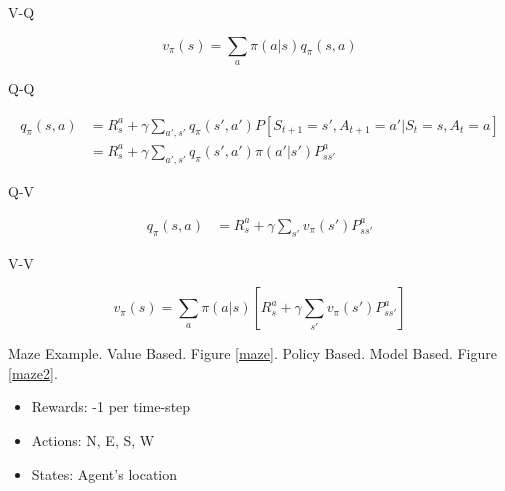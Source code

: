 \documentclass[english]{article}
\begin{document}
V-Q

$$v_\pi(s) = \sum_{a} \pi(a|s) q_\pi(s,a)$$

Q-Q

\begin{align*}
q_\pi(s,a) &= R_s^a +\gamma 
\sum_{a',s'} q_\pi(s',a')
P[S_{t+1}=s',A_{t+1} = a'|S_t = s, A_t=a]\\
&= R_s^a +\gamma 
\sum_{a',s'} q_\pi(s',a')
\pi(a'|s')P_{ss'}^a
\end{align*}

Q-V

\begin{align*}
q_\pi(s,a) &= R_s^a +\gamma 
\sum_{s'} v_\pi(s')P_{ss'}^a
\end{align*}

V-V

$$v_\pi(s) 
= \sum_{a} 
\pi(a|s) 
[R_s^a +\gamma 
\sum_{s'} v_\pi(s')P_{ss'}^a]$$




\item {Maze Example}. {Value Based}. Figure \ref{maze}. {Policy Based}. {Model Based}. Figure \ref{maze2}.


\begin{itemize}
    \item Rewards: -1 per time-step
    \item Actions: N, E, S, W
    \item States: Agent’s location
\end{itemize}
\end{document}
